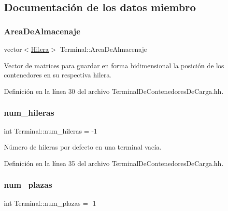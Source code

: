 \subsection{Documentación de los datos miembro}
\mbox{\label{class_terminal_a50670862a5cdeb0504efd1c45b6416dc}} 
\subsubsection{\texorpdfstring{Area\+De\+Almacenaje}{AreaDeAlmacenaje}}
{\footnotesize\ttfamily vector$<$\hyperlink{class_terminal_aba85ff115aaa21fc79271673ad4231b9}{Hilera}$>$ Terminal\+::\+Area\+De\+Almacenaje\hspace{0.3cm}{\ttfamily [private]}}



Vector de matrices para guardar en forma bidimensional la posición de los contenedores en su respectiva hilera. 



Definición en la línea 30 del archivo Terminal\+De\+Contenedores\+De\+Carga.\+hh.

\mbox{\label{class_terminal_a865c963b18aa837549dd637d439e8502}} 
\subsubsection{\texorpdfstring{num\+\_\+hileras}{num\_hileras}}
{\footnotesize\ttfamily int Terminal\+::num\+\_\+hileras = -\/1\hspace{0.3cm}{\ttfamily [private]}}



Número de hileras por defecto en una terminal vacía. 



Definición en la línea 35 del archivo Terminal\+De\+Contenedores\+De\+Carga.\+hh.

\mbox{\label{class_terminal_a14265a71722ee28f3a50cee4a72e5607}} 
\subsubsection{\texorpdfstring{num\+\_\+plazas}{num\_plazas}}
{\footnotesize\ttfamily int Terminal\+::num\+\_\+plazas = -\/1\hspace{0.3cm}{\ttfamily [private]}}



